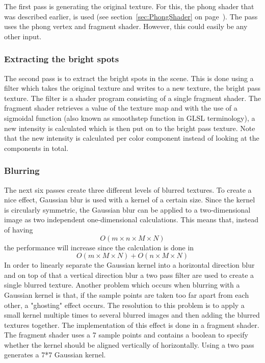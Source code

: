 \documentclass[a4paper,12pt]{article}
\begin{document}
The first pass is generating the original texture. For this, the phong shader that was described earlier, is used (see section~\ref{sec:PhongShader} on page~\pageref{sec:PhongShader}). The pass uses the phong vertex and fragment shader. However, this could easily be any other input.

\subsubsection{Extracting the bright spots}
\label{sec:ExtractingTheBrightSpots}
The second pass is to extract the bright spots in the scene. This is done using a filter which takes the original texture and writes to a new texture, the bright pass texture. The filter is a shader program consisting of a single fragment shader. The fragment shader retrieves a value of the texture map and with the use of a sigmoidal function (also known as smoothstep function in GLSL terminology), a new intensity is calculated which is then put on to the bright pass texture. Note that the new intensity is calculated per color component instead of looking at the components in total.

\subsubsection{Blurring}
\label{sec:Blurring}
The next six passes create three different levels of blurred textures. To create a nice effect, Gaussian blur is used with a kernel of a certain size. Since the kernel is circularly symmetric, the Gaussian blur can be applied to a two-dimensional image as two independent one-dimensional calculations. This means that, instead of having \[O(m \times n \times M \times N)\] the performance will increase since the calculation is done in \[ O(m \times M \times N) + O(n \times M \times N) \] In order to linearly separate the Gaussian kernel into a horizontal direction blur and on top of that a vertical direction blur a two pass filter are used to create a single blurred texture.
Another problem which occurs when blurring with a Gaussian kernel is that, if the sample points are taken too far apart from each other, a "ghosting" effect occurs. The resolution to this problem is to apply a small kernel multiple times to several blurred images and then adding the blurred textures together. The implementation of this effect is done in a fragment shader. The fragment shader uses a 7 sample points and contains a boolean to specify whether the kernel should be aligned vertically of horizontally. Using a two pass generates a 7*7 Gaussian kernel.
\end{document}
